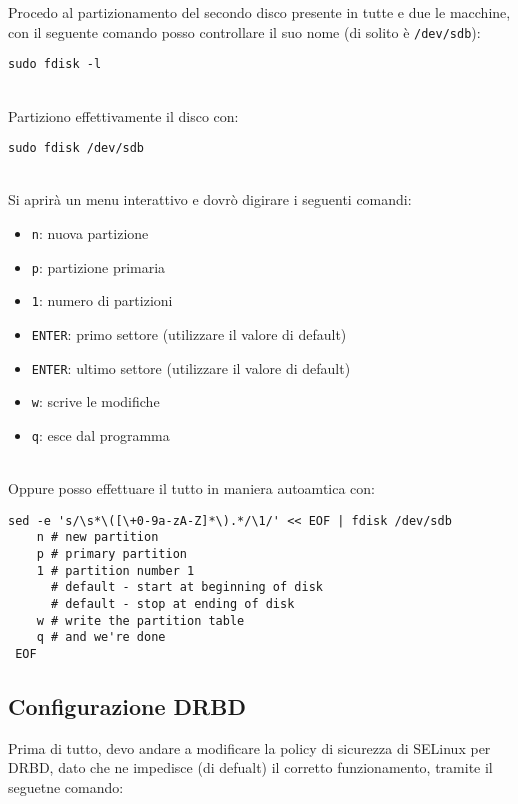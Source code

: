 Procedo al partizionamento del secondo disco presente in tutte e due le macchine, con il seguente comando posso controllare il suo nome (di solito \`{e} \lstinline[style=cmd]|/dev/sdb|):

\begin{lstlisting}[style=cmd]
 sudo fdisk -l
\end{lstlisting}
\ \\
Partiziono effettivamente il disco con:

\begin{lstlisting}[style=cmd]
 sudo fdisk /dev/sdb
\end{lstlisting}
\ \\
Si aprir\`{a} un menu interattivo e dovr\`{o} digirare i seguenti comandi:

\begin{itemize}
	\item \lstinline[style=cmd]|n|: nuova partizione
	\item \lstinline[style=cmd]|p|: partizione primaria
	\item \lstinline[style=cmd]|1|: numero di partizioni
	\item \lstinline[style=cmd]|ENTER|: primo settore (utilizzare il valore di default)
	\item \lstinline[style=cmd]|ENTER|: ultimo settore (utilizzare il valore di default)
	\item \lstinline[style=cmd]|w|: scrive le modifiche
	\item \lstinline[style=cmd]|q|: esce dal programma
\end{itemize}
\ \\
Oppure posso effettuare il tutto in maniera autoamtica con:

\begin{lstlisting}[style=cmd]
 sed -e 's/\s*\([\+0-9a-zA-Z]*\).*/\1/' << EOF | fdisk /dev/sdb
    n # new partition
    p # primary partition
    1 # partition number 1
      # default - start at beginning of disk 
      # default - stop at ending of disk 
    w # write the partition table
    q # and we're done
 EOF
\end{lstlisting}

\subsection{Configurazione DRBD}

Prima di tutto, devo andare a modificare la policy di sicurezza di SELinux per DRBD, dato che ne impedisce (di defualt) il corretto funzionamento, tramite il seguetne comando:

